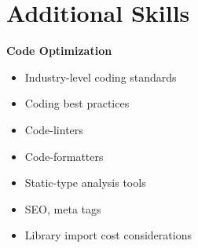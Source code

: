 \documentclass[letterpaper]{deedy-resume} %
\begin{document}
\begin{minipage}[t]{0.33\textwidth} %





\section{Additional Skills}




\textbf{Code Optimization}

\begin{itemize}
\setlength\itemsep{-0.5em} %
\item Industry-level coding standards
\item Coding best practices
\item Code-linters
\item Code-formatters
\item Static-type analysis tools
\item SEO, meta tags
\item Library import cost considerations
\end{itemize}



\end{minipage}
\end{document}
